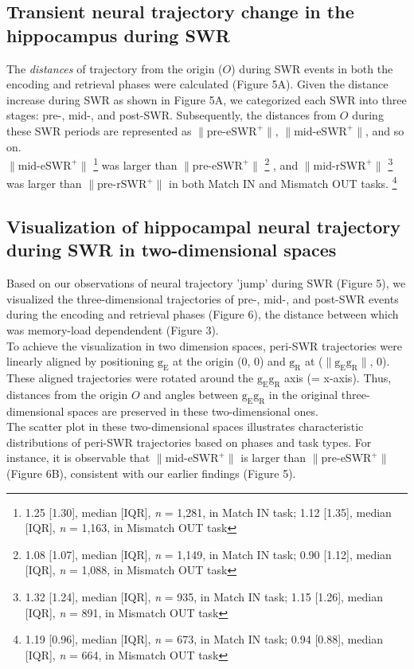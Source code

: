 \documentclass[final,3p,times,twocolumn]{elsarticle}
\begin{document}
\subsection{Transient neural trajectory change in the hippocampus during SWR}
The \textit{distances} of trajectory from the origin ($O$) during SWR events in both the encoding and retrieval phases were calculated (Figure 5A). Given the distance increase during SWR as shown in Figure 5A, we categorized each SWR into three stages: pre-, mid-, and post-SWR. Subsequently, the distances from $O$ during these SWR periods are represented as $\mathrm{\lVert \text{pre-eSWR}^+ \rVert}$, $\mathrm{\lVert \text{mid-eSWR}^+ \rVert}$, and so on.
\\
\indent
$\mathrm{\lVert \text{mid-eSWR}^+ \rVert}$
\footnote{1.25 [1.30], median [IQR], \textit{n} = 1,281, in Match IN task; 1.12 [1.35], median [IQR], \textit{n} = 1,163, in Mismatch OUT task}
was larger than $\mathrm{\lVert \text{pre-eSWR}^+ \rVert}$
\footnote{1.08 [1.07], median [IQR], \textit{n} = 1,149, in Match IN task; 0.90 [1.12], median [IQR], \textit{n} = 1,088, in Mismatch OUT task}
, and $\mathrm{\lVert \text{mid-rSWR}^+ \rVert}$
\footnote{1.32 [1.24], median [IQR], \textit{n} = 935, in Match IN task; 1.15 [1.26], median [IQR], \textit{n} = 891, in Mismatch OUT task}
was larger than $\mathrm{\lVert \text{pre-rSWR}^+ \rVert}$ in both Match IN and Mismatch OUT tasks.
\footnote{1.19 [0.96], median [IQR], \textit{n} = 673, in Match IN task; 0.94 [0.88], median [IQR], \textit{n} = 664, in Mismatch OUT task}

\subsection{Visualization of hippocampal neural trajectory during SWR in two-dimensional spaces}
Based on our observations of neural trajectory 'jump' during SWR (Figure 5), we visualized the three-dimensional trajectories of pre-, mid-, and post-SWR events during the encoding and retrieval phases (Figure 6), the distance between which was memory-load dependendent (Figure 3).
\\
\indent
To achieve the visualization in two dimension spaces, peri-SWR trajectories were linearly aligned by positioning $\mathrm{g_{E}}$ at the origin (0, 0) and $\mathrm{g_{R}}$ at ($\mathrm{\lVert g_{E}g_{R} \rVert}$, 0). These aligned trajectories were rotated around the $\mathrm{g_{E}g_{R}}$ axis (= x-axis). Thus, distances from the origin $O$ and angles between $\mathrm{g_{E}g_{R}}$ in the original three-dimensional spaces are preserved in these two-dimensional ones.
\\
\indent
The scatter plot in these two-dimensional spaces illustrates characteristic distributions of peri-SWR trajectories based on phases and task types. For instance, it is observable that $\mathrm{\lVert \text{mid-eSWR}^+ \rVert}$ is larger than $\mathrm{\lVert \text{pre-eSWR}^+ \rVert}$ (Figure 6B), consistent with our earlier findings (Figure 5).
\end{document}
